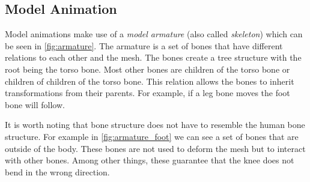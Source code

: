 \subsection{Model Animation} \label{sec:theory_theory_models_animation}
Model animations make use of a \textit{model armature} (also called \textit{skeleton}) which can be seen in \autoref{fig:armature}.
The armature is a set of bones that have different relations to each other and the mesh.
The bones create a tree structure with the root being the torso bone.
Most other bones are children of the torso bone or children of children of the torso bone.
This relation allows the bones to inherit transformations from their parents.
For example, if a leg bone moves the foot bone will follow.

It is worth noting that bone structure does not have to resemble the human bone structure.
For example in \autoref{fig:armature_foot} we can see a set of bones that are outside of the body.
These bones are not used to deform the mesh but to interact with other bones.
Among other things, these guarantee that the knee does not bend in the wrong direction.


